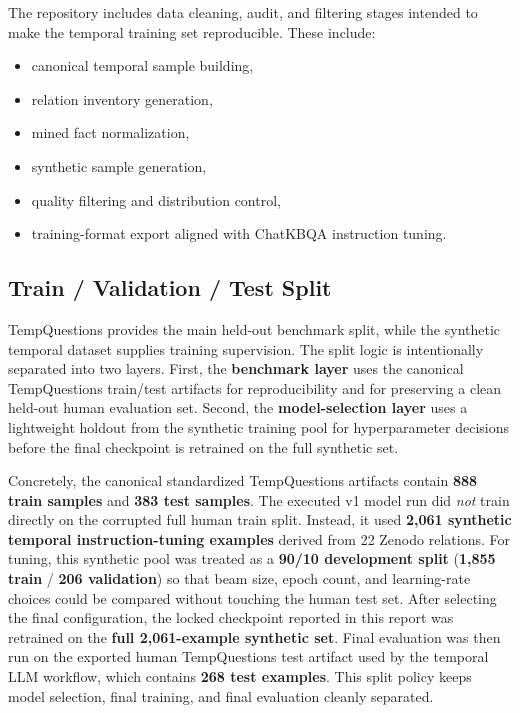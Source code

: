 \documentclass[a4paper,11pt]{article}
\begin{document}
The repository includes data cleaning, audit, and filtering stages intended to make the temporal training set reproducible. These include:

\begin{itemize}[leftmargin=1.2cm]
  \item canonical temporal sample building,
  \item relation inventory generation,
  \item mined fact normalization,
  \item synthetic sample generation,
  \item quality filtering and distribution control,
  \item training-format export aligned with ChatKBQA instruction tuning.
\end{itemize}

\subsection{Train / Validation / Test Split}

TempQuestions provides the main held-out benchmark split, while the synthetic temporal dataset supplies training supervision. The split logic is intentionally separated into two layers. First, the \textbf{benchmark layer} uses the canonical TempQuestions train/test artifacts for reproducibility and for preserving a clean held-out human evaluation set. Second, the \textbf{model-selection layer} uses a lightweight holdout from the synthetic training pool for hyperparameter decisions before the final checkpoint is retrained on the full synthetic set.

\noindent Concretely, the canonical standardized TempQuestions artifacts contain \textbf{888 train samples} and \textbf{383 test samples}. The executed v1 model run did \emph{not} train directly on the corrupted full human train split. Instead, it used \textbf{2,061 synthetic temporal instruction-tuning examples} derived from 22 Zenodo relations. For tuning, this synthetic pool was treated as a \textbf{90/10 development split} (\textbf{1,855 train} / \textbf{206 validation}) so that beam size, epoch count, and learning-rate choices could be compared without touching the human test set. After selecting the final configuration, the locked checkpoint reported in this report was retrained on the \textbf{full 2,061-example synthetic set}. Final evaluation was then run on the exported human TempQuestions test artifact used by the temporal LLM workflow, which contains \textbf{268 test examples}. This split policy keeps model selection, final training, and final evaluation cleanly separated.
\end{document}
